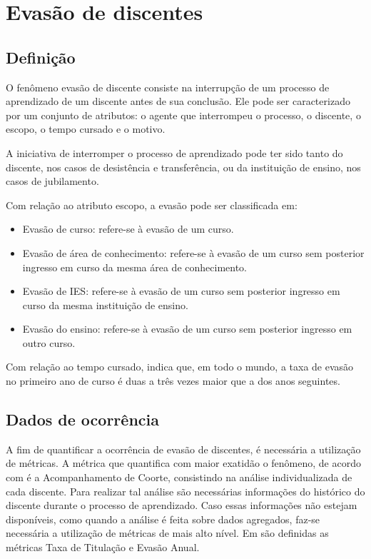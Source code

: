 \chapter{Evasão de discentes}

\section{Definição}

O fenômeno evasão de discente consiste na interrupção de um processo de aprendizado de um discente antes de sua conclusão. Ele pode ser caracterizado por um conjunto de atributos: o agente que interrompeu o processo, o discente, o escopo, o tempo cursado e o motivo.

A iniciativa de interromper o processo de aprendizado pode ter sido tanto do discente, nos casos de desistência e transferência, ou da instituição de ensino, nos casos de jubilamento.

Com relação ao atributo escopo, a evasão pode ser classificada em:

\begin{itemize}
\item Evasão de curso: refere-se à evasão de um curso.
\item Evasão de área de conhecimento: refere-se à evasão de um curso sem posterior ingresso em curso da mesma área de conhecimento.
\item Evasão de IES: refere-se à evasão de um curso sem posterior ingresso em curso da mesma instituição de ensino. 
\item Evasão do ensino: refere-se à evasão de um curso sem posterior ingresso em outro curso.
\end{itemize}

Com relação ao tempo cursado, \cite{evasao_panorama} indica que, em todo o mundo, a taxa de evasão no primeiro ano de curso é duas a três vezes maior que a dos anos seguintes.

\section{Dados de ocorrência}

A fim de quantificar a ocorrência de evasão de discentes, é necessária a utilização de métricas. A métrica que quantifica com maior exatidão o fenômeno, de acordo com \cite{evasao_panorama2} é a Acompanhamento de Coorte, consistindo na análise individualizada de cada discente. Para realizar tal análise são necessárias informações do histórico do discente durante o processo de aprendizado. Caso essas informações não estejam disponíveis, como quando a análise é feita sobre dados agregados, faz-se necessária a utilização de métricas de mais alto nível. Em \cite{mudanca_calculos} são definidas as métricas Taxa de Titulação e Evasão Anual.

